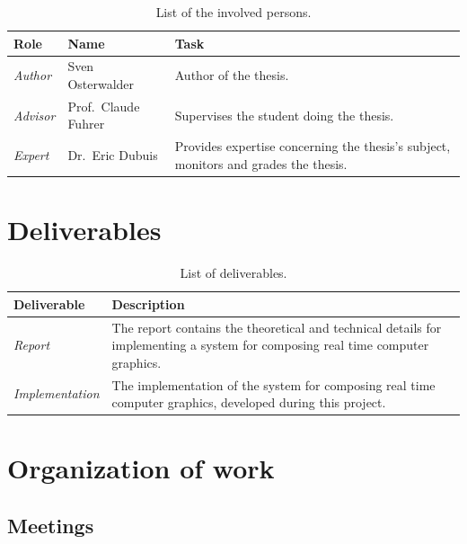 \documentclass[%
    a4paper,    %
    justified,  %
    nobib,      %
    openany     %
]{tufte-book}
\begin{document}
\begin{table}[h]
  \caption{List of the involved persons.}
  \begin{tabularx}{\textwidth}{llX}
    \toprule
    \textbf{Role} & \textbf{Name} & \textbf{Task} \\
    \midrule
    \textit{Author}  & Sven Osterwalder\protect\footnotemark[1]{} & Author of the thesis.\\
    \textit{Advisor} & Prof.\ Claude Fuhrer\protect\footnotemark[2]{} & Supervises the student doing the thesis.\\
    \textit{Expert}  & Dr.\ Eric Dubuis\protect\footnotemark[3]{}     & Provides expertise concerning the thesis's subject, monitors and grades the thesis.\\
    \bottomrule
  \end{tabularx}
\end{table}

\newpage{}

\section{Deliverables}
\label{sec:deliverables}

\begin{table}[h]
  \caption{List of deliverables.}
  \begin{tabularx}{\textwidth}{lX}
    \toprule
    \textbf{Deliverable} & \textbf{Description} \\
    \midrule
    \textit{Report} & The report contains the theoretical and technical details for
    implementing a system for composing real time computer graphics. \\
    \midrule
    \textit{Implementation} & The implementation of the system for composing real time
    computer graphics, developed during this project. \\
    \bottomrule
  \end{tabularx}
\end{table}

\section{Organization of work}
\label{sec:organization-of-work}

\subsection{Meetings}
\label{subsec:meetings}
\end{document}
